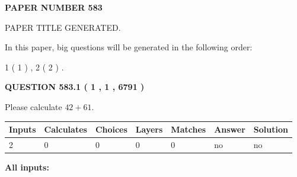 \documentclass[12pt]{article}
\begin{document}
   
   
   
\newpage 
\setcounter{page}{ 
   583001 } 
   
   
   
   
 {\textbf{ \Large{ PAPER NUMBER  583  }}}
   
   
\vspace{0.2in}
   
   
   
   
   
   
   
   
 \vspace{0.2in}
 
 
 
 
   
   
 PAPER TITLE GENERATED.
   
   
   
\vspace{0.2in}
   
In this paper, big questions will be generated in the following order: 
   
   
   1 ( 1 )
 ,
   2 ( 2 )
 .
  
\vspace{0.2in}
  
{\textbf{\Large{QUESTION
583.1 
 ( 1 , 1 , 6791 )
}}}
  
  
 
Please calculate $ %
42 +  %
61 $.
 
 
   
   
   
   
\noindent\begin{tabular}{|l|l|l|l|l|l|l|}
 \hline
Inputs & Calculates & Choices & Layers & Matches & Answer & Solution \\ \hline
 2  & 
 0  & 
 0
  & 
 0  & 
 0  & 
  no & 
  no 
  \\ \hline
 \end{tabular}
   
   
   
   
\noindent{}
   
   
   
   
\noindent\vspace{0.1in}\hspace{-0.08in} {\textbf{\Large{All inputs: }}}
   
   
  
\end{document}
